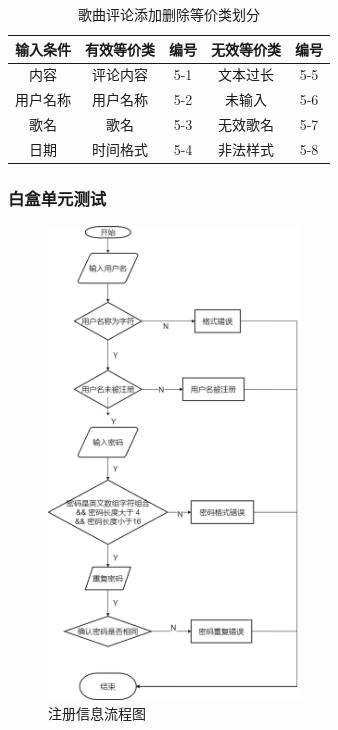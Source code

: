 \documentclass[UTF8,14pt]{article}
\numberwithin{figure}{subsubsection}
\numberwithin{table}{subsubsection}
\begin{document}
\begin{table}[H]
	\centering
	\begin{tabular}{|c|c|c|c|c|}
		\hline
		输入条件 & 有效等价类 & 编号 & 无效等价类 & 编号 \\ \hline
		内容     & 评论内容   & 5-1  & 文本过长   & 5-5  \\ \hline
		用户名称 & 用户名称   & 5-2  & 未输入     & 5-6  \\ \hline
		歌名     & 歌名       & 5-3  & 无效歌名   & 5-7  \\ \hline
		日期     & 时间格式   & 5-4  & 非法样式   & 5-8  \\ \hline
	\end{tabular}
	\caption{歌曲评论添加删除等价类划分}
\end{table}
\subsubsection{白盒单元测试}
\begin{minipage}[t]{0.5\linewidth}
	\centering
	\begin{figure}[H]
		\includegraphics[width=6.69cm,height=12.53cm]{figures/白盒1.png}
		\caption{注册信息流程图}
	\end{figure}
\end{minipage}
\hfill
\end{document}

